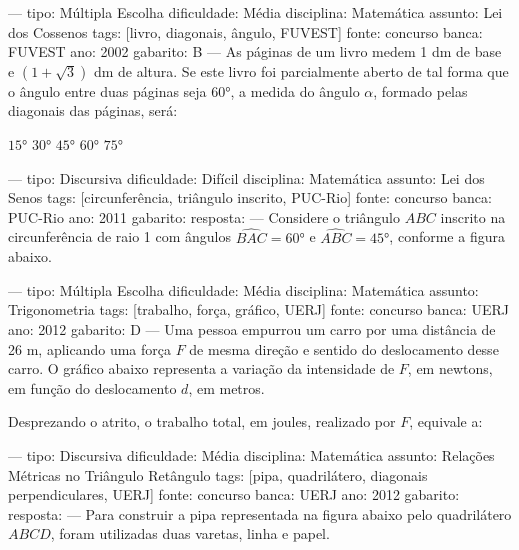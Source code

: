 ---
tipo: Múltipla Escolha
dificuldade: Média
disciplina: Matemática
assunto: Lei dos Cossenos
tags: [livro, diagonais, ângulo, FUVEST]
fonte: concurso
banca: FUVEST
ano: 2002
gabarito: B
---
\question
As páginas de um livro medem 1 dm de base e $\left(1 + \sqrt{3}\right)$ dm de altura. Se este livro foi parcialmente aberto de tal forma que o ângulo entre duas páginas seja $60°$, a medida do ângulo $\alpha$, formado pelas diagonais das páginas, será:
\begin{choices}
\choice $15°$
\correctchoice $30°$
\choice $45°$
\choice $60°$
\choice $75°$
\end{choices}

---
tipo: Discursiva
dificuldade: Difícil
disciplina: Matemática
assunto: Lei dos Senos
tags: [circunferência, triângulo inscrito, PUC-Rio]
fonte: concurso
banca: PUC-Rio
ano: 2011
gabarito:
resposta:
---
\question
Considere o triângulo $ABC$ inscrito na circunferência de raio 1 com ângulos $\widehat{BAC} = 60°$ e $\widehat{ABC} = 45°$, conforme a figura abaixo.



---
tipo: Múltipla Escolha
dificuldade: Média
disciplina: Matemática
assunto: Trigonometria
tags: [trabalho, força, gráfico, UERJ]
fonte: concurso
banca: UERJ
ano: 2012
gabarito: D
---
\question
Uma pessoa empurrou um carro por uma distância de 26 m, aplicando uma força $F$ de mesma direção e sentido do deslocamento desse carro. O gráfico abaixo representa a variação da intensidade de $F$, em newtons, em função do deslocamento $d$, em metros.


Desprezando o atrito, o trabalho total, em joules, realizado por $F$, equivale a:
\begin{choices}
\end{choices}

---
tipo: Discursiva
dificuldade: Média
disciplina: Matemática
assunto: Relações Métricas no Triângulo Retângulo
tags: [pipa, quadrilátero, diagonais perpendiculares, UERJ]
fonte: concurso
banca: UERJ
ano: 2012
gabarito:
resposta:
---
\question
Para construir a pipa representada na figura abaixo pelo quadrilátero $ABCD$, foram utilizadas duas varetas, linha e papel.

